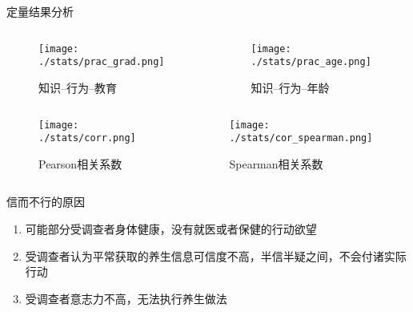 \begin{frame}[allowframebreaks]{定量结果分析}
    \begin{columns}
    \begin{column}{0.5\textwidth}
        \begin{figure}[h]
            \caption{知识--行为--教育}
            \texttt{[image: ./stats/prac\_grad.png]}
            
        \end{figure}
        
    \end{column}
    \begin{column}{0.5\textwidth}
        \begin{figure}[h] 
            \caption{知识--行为--年龄}
            \texttt{[image: ./stats/prac\_age.png]}
        \end{figure}
    \end{column}
\end{columns}
    \begin{columns}
    \begin{column}{0.6\textwidth}
        \begin{figure}[h]
            \texttt{[image: ./stats/corr.png]}
            \caption{Pearson相关系数}
        \end{figure}
    \end{column}
    \begin{column}{0.6\textwidth}
        \begin{figure}[h]
            \texttt{[image: ./stats/cor\_spearman.png]}
            \caption{Spearman相关系数}
        \end{figure} 
    \end{column}
\end{columns}

\begin{exampleblock}{信而不行的原因}
    \begin{enumerate}
        \item 可能部分受调查者身体健康，没有就医或者保健的行动欲望
        \item 受调查者认为平常获取的养生信息可信度不高，半信半疑之间，不会付诸实际行动
        \item 受调查者意志力不高，无法执行养生做法
    \end{enumerate}
\end{exampleblock}
\end{frame}
